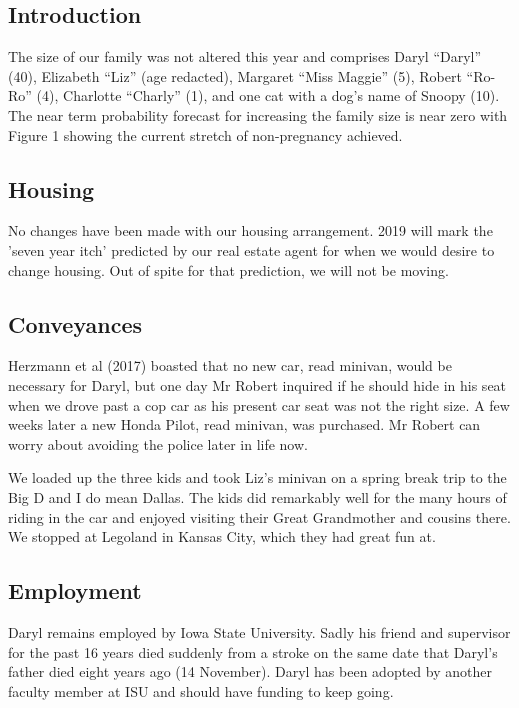 \documentclass[letterpaper,11pt]{article}
\begin{document}
\begin{multicols}{2}

\section{Introduction} 

The size of our family was not altered this year and comprises Daryl
\enquote{Daryl} (40), Elizabeth \enquote{Liz} (age redacted),
Margaret \enquote{Miss Maggie} (5), Robert \enquote{Ro-Ro} (4), Charlotte
 \enquote{Charly} (1), and one cat with a dog's name of Snoopy (10).  The near
 term probability forecast for increasing the family size is near zero with
 Figure 1 showing the current stretch of non-pregnancy achieved.  

\subsection{Housing}

No changes have been made with our housing arrangement. 2019 will mark the
'seven year itch' predicted by our real estate agent for when we would desire
to change housing. Out of spite for that prediction, we will not be moving.

\subsection{Conveyances}

Herzmann et al (2017) boasted that no new car, read minivan, would be necessary
for Daryl, but one day Mr Robert inquired if he should hide in his seat when
we drove past a cop car as his present car seat was not the right size. A few
weeks later a new Honda Pilot, read minivan, was purchased.  Mr Robert can
worry about avoiding the police later in life now.

We loaded up the three kids and took Liz's minivan on a spring break trip to
the Big D and I do mean Dallas. The kids did remarkably well for the many
hours of riding in the car and enjoyed visiting their Great Grandmother and
cousins there.  We stopped at Legoland in Kansas City, which they had great
fun at.

\subsection{Employment}
Daryl remains employed by Iowa State University. Sadly his friend and supervisor
for the past 16 years died suddenly from a stroke on the same date that Daryl's
father died eight years ago (14 November). Daryl has been adopted by another
faculty member at ISU and should have funding to keep going.


\end{multicols}
\end{document}
